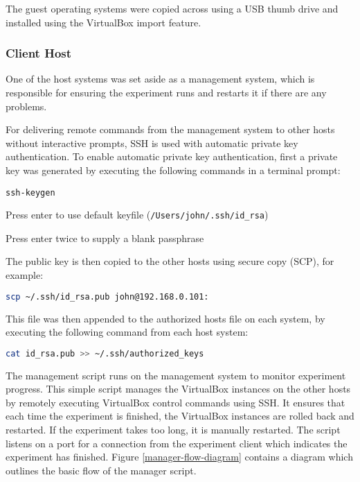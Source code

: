 The guest operating systems were copied across using a USB thumb drive and
installed using the VirtualBox import feature.

\subsubsection{Client Host}

One of the host systems was set aside as a management system, which is
responsible for ensuring the experiment runs and restarts it if there are any
problems.

For delivering remote commands from the management system to other hosts without
interactive prompts, SSH is used with automatic private key authentication. To
enable automatic private key authentication, first a private key was generated
by executing the following commands in a terminal prompt:

\begin{enumerate*}
  \item \verb+ssh-keygen+
  \item Press enter to use default keyfile (\verb+/Users/john/.ssh/id_rsa+)
  \item Press enter twice to supply a blank passphrase
\end{enumerate*}

The public key is then copied to the other hosts using secure copy (SCP), for example:
\begin{lstlisting}[language=sh]
  scp ~/.ssh/id_rsa.pub john@192.168.0.101:
\end{lstlisting}

This file was then appended to the authorized hosts file on each system, by
executing the following command from each host system:
\begin{lstlisting}[language=sh]
  cat id_rsa.pub >> ~/.ssh/authorized_keys
\end{lstlisting}

The management script runs on the management system to monitor experiment
progress. This simple script manages the VirtualBox instances on the other hosts
by remotely executing VirtualBox control commands using SSH. It ensures that
each time the experiment is finished, the VirtualBox instances are rolled back
and restarted. If the experiment takes too long, it is manually restarted. The
script listens on a port for a connection from the experiment client which
indicates the experiment has finished. Figure \ref{manager-flow-diagram}
contains a diagram which outlines the basic flow of the manager script.

